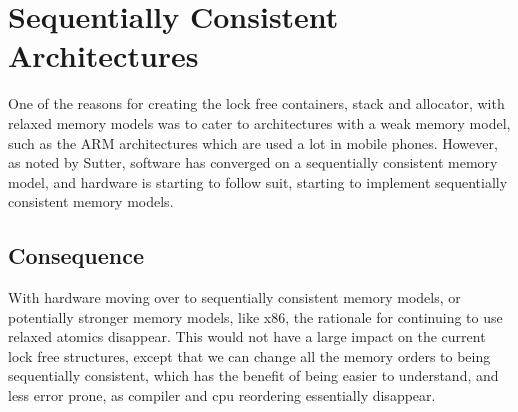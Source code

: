 \section{Sequentially Consistent Architectures}
\label{subsec:longevity_sequentially_consistent_architectures}
One of the reasons for creating the lock free containers, stack and allocator,
with relaxed memory models was to cater to architectures with a weak memory model,
such as the ARM architectures which are used a lot in mobile phones.
However, as noted by Sutter\cite[55:15]{herb_sutter_atomic_weapons},
software has converged on a sequentially consistent memory model,
and hardware is starting to follow suit, starting to implement sequentially
consistent memory models.

\subsection{Consequence}
With hardware moving over to sequentially consistent memory models,
or potentially stronger memory models, like x86\cite{preshing_weak_vs_strong_memory_models},
the rationale for continuing to use relaxed atomics disappear.
This would not have a large impact on the current lock free
structures, except that we can change all the memory orders
to being sequentially consistent, which has the benefit of being
easier to understand, and less error prone, as compiler and cpu reordering
essentially disappear.
